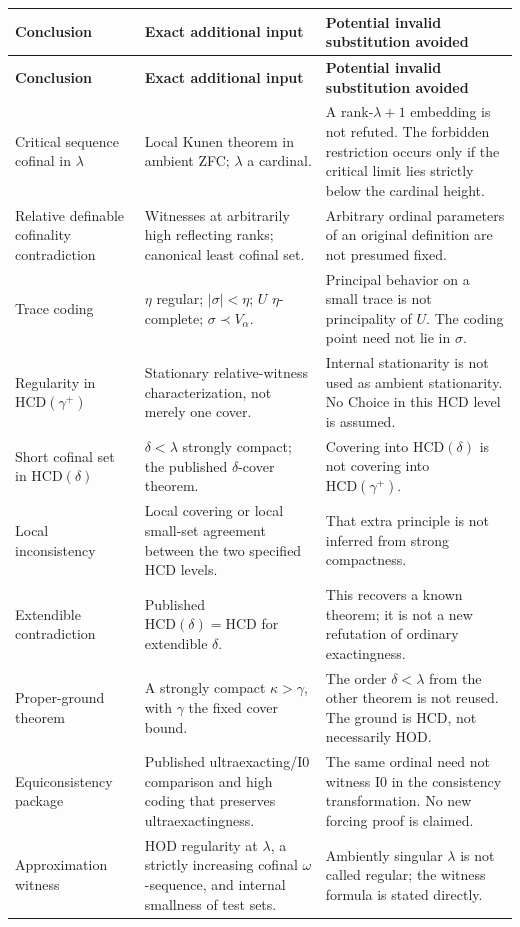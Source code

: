 \documentclass[11pt,letterpaper]{article}
\theoremstyle{definition}
\newcommand{\Izero}{\mathrm{I0}}
\newcommand{\HCD}{\mathrm{HCD}}
\begin{document}
\begingroup\small
\renewcommand{\arraystretch}{1.13}
\begin{longtable}{@{}P{.24\textwidth}P{.34\textwidth}P{.35\textwidth}@{}}
\toprule
\textbf{Conclusion}&\textbf{Exact additional input}&\textbf{Potential invalid substitution avoided}\\
\midrule\endfirsthead
\toprule
\textbf{Conclusion}&\textbf{Exact additional input}&\textbf{Potential invalid substitution avoided}\\
\midrule\endhead
Critical sequence cofinal in $\lambda$ & Local Kunen theorem in ambient ZFC; $\lambda$ a cardinal. & A rank-$\lambda+1$ embedding is not refuted. The forbidden restriction occurs only if the critical limit lies strictly below the cardinal height.\\[6pt]
Relative definable cofinality contradiction & Witnesses at arbitrarily high reflecting ranks; canonical least cofinal set. & Arbitrary ordinal parameters of an original definition are not presumed fixed.\\[6pt]
Trace coding & $\eta$ regular; $|\sigma|<\eta$; $U$ $\eta$-complete; $\sigma\prec V_\alpha$. & Principal behavior on a small trace is not principality of $U$. The coding point need not lie in $\sigma$.\\[6pt]
Regularity in $\HCD(\gamma^+)$ & Stationary relative-witness characterization, not merely one cover. & Internal stationarity is not used as ambient stationarity. No Choice in this HCD level is assumed.\\[6pt]
Short cofinal set in $\HCD(\delta)$ & $\delta<\lambda$ strongly compact; the published $\delta$-cover theorem. & Covering into $\HCD(\delta)$ is not covering into $\HCD(\gamma^+)$.\\[6pt]
Local inconsistency & Local covering or local small-set agreement between the two specified HCD levels. & That extra principle is not inferred from strong compactness.\\[6pt]
Extendible contradiction & Published $\HCD(\delta)=\HCD$ for extendible $\delta$. & This recovers a known theorem; it is not a new refutation of ordinary exactingness.\\[6pt]
Proper-ground theorem & A strongly compact $\kappa>\gamma$, with $\gamma$ the fixed cover bound. & The order $\delta<\lambda$ from the other theorem is not reused. The ground is HCD, not necessarily HOD.\\[6pt]
Equiconsistency package & Published ultraexacting/$\Izero$ comparison and high coding that preserves ultraexactingness. & The same ordinal need not witness $\Izero$ in the consistency transformation. No new forcing proof is claimed.\\[6pt]
Approximation witness & HOD regularity at $\lambda$, a strictly increasing cofinal $\omega$-sequence, and internal smallness of test sets. & Ambiently singular $\lambda$ is not called regular; the witness formula is stated directly.\\
\bottomrule
\end{longtable}
\endgroup
\end{document}
